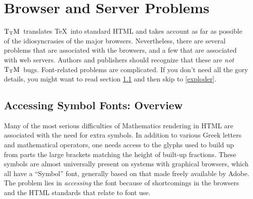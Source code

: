 \documentclass[12pt]{article}
\def\TtM{$\rm{}T_TH$}
\def\TtM{$\rm{}T_TM$}%
\begin{document}
\section{Browser and Server Problems}

\TtM\ translates \TeX\ into standard HTML and takes account as far as
possible of the idiosyncrasies of the major browsers. Nevertheless,
there are several problems that are associated with the browsers, and
a few that are associated with web servers. Authors and publishers
should recognize that these are \emph{not} \TtM\ bugs. Font-related
problems are complicated. If you don't need all the gory details, you
might want to read section \ref{fontoverview} and then skip to
\ref{exploder}.

\subsection{Accessing Symbol Fonts: Overview}\label{fontoverview}

Many of the most serious difficulties of Mathematics rendering in HTML
are associated with the need for extra symbols. In addition to various
Greek letters and mathematical operators, one needs access to the
glyphs used to build up from parts the large brackets matching the
height of built-up fractions. These symbols are almost universally
present on systems with graphical browsers, which all have a
``Symbol'' font, generally based on that made freely available by
Adobe. The problem lies in \emph{accessing} the font because of
shortcomings in the browsers and the HTML standards that relate to
font use.
\end{document}
